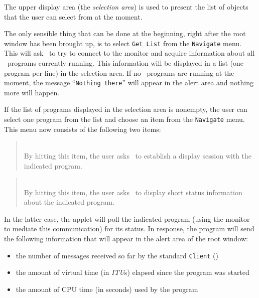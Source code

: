 The upper display area (the {\em selection area\/}) is used to present
the list of objects that the user can select from at the moment.

The only sensible thing that can be done at the beginning, right after the
root window has been brought up, is to select {\tt Get~List} from the
{\tt Navigate} menu.
This will ask \dsd\ to try to connect to the monitor and acquire information
about all \smurph\ programs currently running.
This information will be displayed in a list (one program per line) in
the selection area.
If no \smurph\ programs are running at the moment, the message
``{\tt Nothing there}'' will appear in the alert area and nothing more
will happen.

If the list of programs displayed in the selection area is nonempty, the
user can select one program from the list and choose an item
from the {\tt Navigate} menu.
This menu now consists of the following two items:
\medskip

\begin{quote}
\noindent{}\\ \hspace{0in}
By hitting this item, the user asks \dsd\ to establish a display session
with the indicated program.
\end{quote}

\begin{quote}
\noindent{}\\ \hspace{0in}
By hitting this item, the user asks \dsd\ to display short status
information about the indicated program.
\end{quote}\medskip

In the latter case, the applet will poll the indicated program
(using the monitor to mediate this communication) for its status.
In response, the program will send the following information that will appear
in the alert area of the root window:

\begin{itemize}
\item
the number of messages received so far by the standard {\tt Client}
()
\item
the amount of virtual time (in {\em ITU\/}s)
elapsed since the program was started
\item
the amount of CPU time (in seconds) used by the program
\end{itemize}

